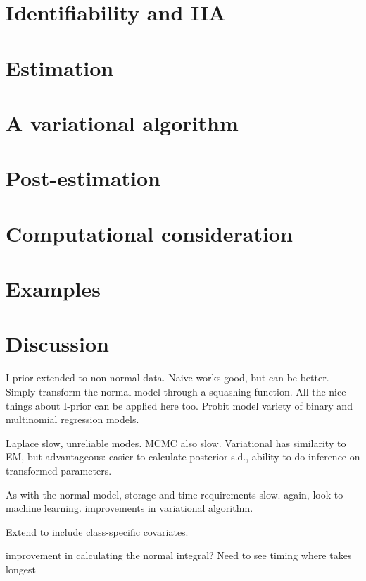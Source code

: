 \documentclass[a4paper,showframe,11pt]{report}
\begin{document}
\section{Identifiability and IIA}\label{sec:iia}


\section{Estimation}


\section{A variational algorithm}\label{sec:iprobitvar}


\section{Post-estimation}


\section{Computational consideration}


\section{Examples}

\section{Discussion}

I-prior extended to non-normal data. 
Naive works good, but can be better.
Simply transform the normal model through a squashing function.
All the nice things about I-prior can be applied here too.
Probit model variety of binary and multinomial regression models.

Laplace slow, unreliable modes. MCMC also slow. Variational has similarity to EM, but advantageous: easier to calculate posterior s.d., ability to do inference on transformed parameters.

As with the normal model, storage and time requirements slow.
again, look to machine learning.
improvements in variational algorithm.

Extend to include class-specific covariates.

improvement in calculating the normal integral?
Need to see timing where takes longest
\end{document}
